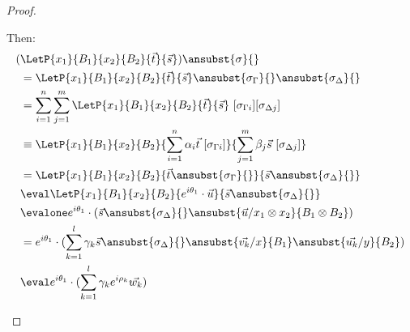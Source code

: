 \begin{proof}
\begin{description}
    Then:
    \begin{align*}
        (&\LetP{x_1}{B_1}{x_2}{B_2}{\vec{t}}{\vec{s}})\ansubst{\sigma}{} \\
        &= \LetP{x_1}{B_1}{x_2}{B_2}{\vec{t}}{\vec{s}}\ansubst{\sigma_\Gamma}{}\ansubst{\sigma_\Delta}{}\\
        &=\sum_{i=1}^{n}\sum_{j=1}^{m}\LetP{x_1}{B_1}{x_2}{B_2}{\vec{t}}{\vec{s}}\ [\sigma_{\Gamma i}][\sigma_{\Delta j}]\\
        &\equiv \LetP{x_1}{B_1}{x_2}{B_2}{\sum_{i=1}^{n}\alpha_i\vec{t}\ [\sigma_{\Gamma i}]}{\sum_{j=1}^{m}\beta_j \vec{s}\ [\sigma_{\Delta j}]}\\
        &=\LetP{x_1}{B_1}{x_2}{B_2}{\vec{t}\ansubst{\sigma_\Gamma}{}}{\vec{s}\ansubst{\sigma_\Delta}{}}\\
        &\eval\LetP{x_1}{B_1}{x_2}{B_2}{e^{i\theta_1}\cdot\vec{u}}{\vec{s}\ansubst{\sigma_\Delta}{}}\\
        &\evalone e^{i\theta_1}\cdot(\vec{s}\ansubst{\sigma_\Delta}{}\ansubst{\vec{u}/x_1\otimes x_2}{B_1\otimes B_2})\\
        &=e^{i\theta_1}\cdot(\sum_{k=1}^{l}\gamma_k\vec{s}\ansubst{\sigma_\Delta}{}\ansubst{\vec{v_k}/x}{B_1}\ansubst{\vec{u_k}/y}{B_2})\\
        &\eval e^{i\theta_1}\cdot(\sum_{k=1}^{l}\gamma_k e^{i\rho_k} \vec{w_k})\\
    \end{align*}


\end{description}
\end{proof}
